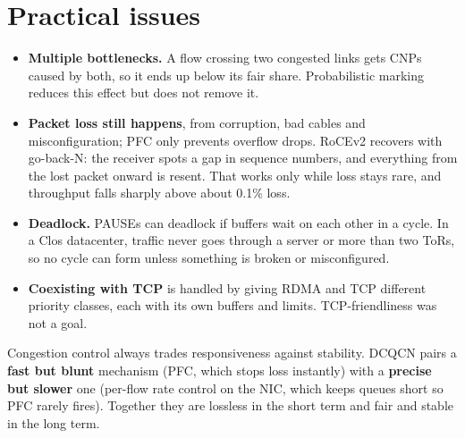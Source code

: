 \section{Practical issues}\label{sec:dqpractical}
\begin{itemize}
  \item \textbf{Multiple bottlenecks.} A flow crossing two congested links gets CNPs caused by both, so it ends up below its fair share. Probabilistic
        marking reduces this effect but does not remove it.
  \item \textbf{Packet loss still happens}, from corruption, bad cables and misconfiguration; PFC only prevents overflow drops. RoCEv2 recovers with
        go-back-N: the receiver spots a gap in sequence numbers, and everything from the lost packet onward is resent. That works only while loss stays
        rare, and throughput falls sharply above about 0.1\% loss.
  \item \textbf{Deadlock.} PAUSEs can deadlock if buffers wait on each other in a cycle. In a Clos datacenter, traffic never goes through a server or
        more than two ToRs, so no cycle can form unless something is broken or misconfigured.
  \item \textbf{Coexisting with TCP} is handled by giving RDMA and TCP different priority classes, each with its own buffers and limits. TCP-friendliness
        was not a goal.
\end{itemize}

\begin{keybox}
Congestion control always trades responsiveness against stability. DCQCN pairs a \textbf{fast but blunt} mechanism (PFC, which stops loss
instantly) with a \textbf{precise but slower} one (per-flow rate control on the NIC, which keeps queues short so PFC rarely fires). Together they are
lossless in the short term and fair and stable in the long term.
\end{keybox}

